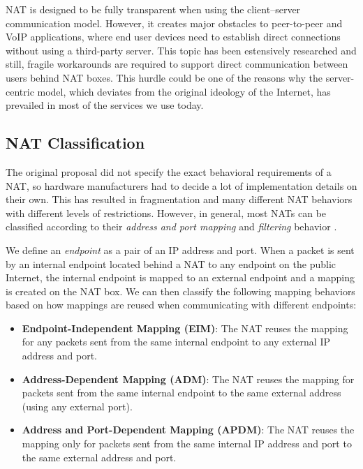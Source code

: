 NAT is designed to be fully transparent when using the client–server communication model. However, it creates major obstacles to peer-to-peer and VoIP applications, where end user devices need to establish direct connections without using a third-party server. This topic has been estensively researched and still, fragile workarounds are required to support direct communication between users behind NAT boxes. This hurdle could be one of the reasons why the server-centric model, which deviates from the original ideology of the Internet, has prevailed in most of the services we use today.

\subsection{NAT Classification}
\label{nat-classification}


The original proposal did not specify the exact behavioral requirements of a NAT, so hardware manufacturers had to decide a lot of implementation details on their own. This has resulted in fragmentation and many different NAT behaviors with different levels of restrictions. However, in general, most NATs can be classified according to their \textit{address and port mapping} and \textit{filtering} behavior \cite{behave}.

We define an \textit{endpoint} as a pair of an IP address and port. When a packet is sent by an internal endpoint located behind a NAT to any endpoint on the public Internet, the internal endpoint is mapped to an external endpoint and a mapping is created on the NAT box. We can then classify the following mapping behaviors based on how mappings are reused when communicating with different endpoints:

\begin{itemize}
    \item \textbf{Endpoint-Independent Mapping (EIM)}: The NAT reuses the mapping for any packets sent from the same internal endpoint to any external IP address and port.
    \item \textbf{Address-Dependent Mapping (ADM)}: The NAT reuses the mapping for packets sent from the same internal endpoint to the same external address (using any external port).
    \item \textbf{Address and Port-Dependent Mapping (APDM)}: The NAT reuses the mapping only for packets sent from the same internal IP address and port to the same external address and port.
\end{itemize}


